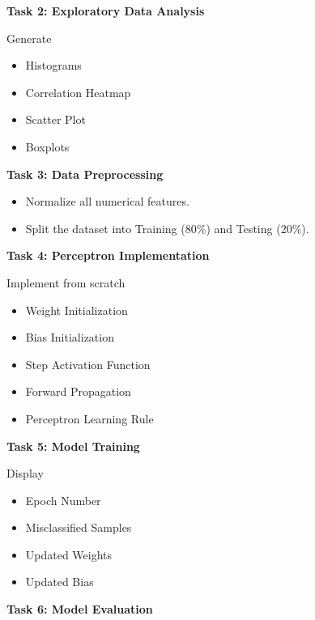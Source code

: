 \documentclass[11pt]{article}
\begin{document}
\vspace{4mm}

\textbf{Task 2: Exploratory Data Analysis}

Generate

\begin{itemize}
\item Histograms
\item Correlation Heatmap
\item Scatter Plot
\item Boxplots
\end{itemize}

\vspace{2mm}

\textbf{Task 3: Data Preprocessing}

\begin{itemize}
\item Normalize all numerical features.
\item Split the dataset into Training (80\%) and Testing (20\%).
\end{itemize}

\vspace{2mm}

\textbf{Task 4: Perceptron Implementation}

Implement from scratch

\begin{itemize}
\item Weight Initialization
\item Bias Initialization
\item Step Activation Function
\item Forward Propagation
\item Perceptron Learning Rule
\end{itemize}

\vspace{2mm}

\textbf{Task 5: Model Training}

Display

\begin{itemize}
\item Epoch Number
\item Misclassified Samples
\item Updated Weights
\item Updated Bias
\end{itemize}

\vspace{2mm}

\textbf{Task 6: Model Evaluation}
\end{document}
